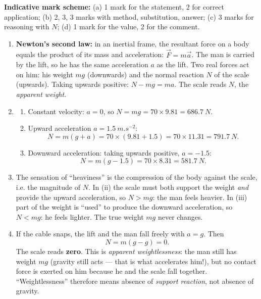\documentclass[11pt]{article}
\begin{document}
\begin{corrige}
\textbf{Indicative mark scheme:} (a) 1 mark for the statement, 2 for correct application; (b) 2, 3, 3 marks with method, substitution, answer; (c) 3 marks for reasoning with $N$; (d) 1 mark for the value, 2 for the comment.

\begin{enumerate}
\item \textbf{Newton's second law:} in an inertial frame, the resultant force on a body equals the product of its mass and acceleration: $\vec{F}=m\vec{a}$. The man is carried by the lift, so he has the same acceleration $a$ as the lift. Two real forces act on him: his weight $mg$ (downwards) and the normal reaction $N$ of the scale (upwards). Taking upwards positive: $N-mg=ma$. The scale reads $N$, the \emph{apparent weight}.
\item \begin{enumerate}
\item Constant velocity: $a=0$, so $N=mg=70\times 9.81=\SI{686.7}{N}$.
\item Upward acceleration $a=\SI{1.5}{m.s^{-2}}$:
\[ N=m(g+a)=70\times(9.81+1.5)=70\times 11.31=\SI{791.7}{N}. \]
\item Downward acceleration: taking upwards positive, $a=-1.5$:
\[ N=m(g-1.5)=70\times 8.31=\SI{581.7}{N}. \]
\end{enumerate}
\item The sensation of ``heaviness'' is the compression of the body against the scale, i.e. the magnitude of $N$. In (ii) the scale must both support the weight \emph{and} provide the upward acceleration, so $N>mg$: the man feels heavier. In (iii) part of the weight is ``used'' to produce the downward acceleration, so $N<mg$: he feels lighter. The true weight $mg$ never changes.
\item If the cable snaps, the lift and the man fall freely with $a=g$. Then
\[ N=m(g-g)=0. \]
The scale reads \textbf{zero}. This is \emph{apparent weightlessness}: the man still has weight $mg$ (gravity still acts --- that is what accelerates him!), but no contact force is exerted on him because he and the scale fall together. ``Weightlessness'' therefore means absence of \emph{support reaction}, not absence of gravity.
\end{enumerate}
\end{corrige}
\end{document}
